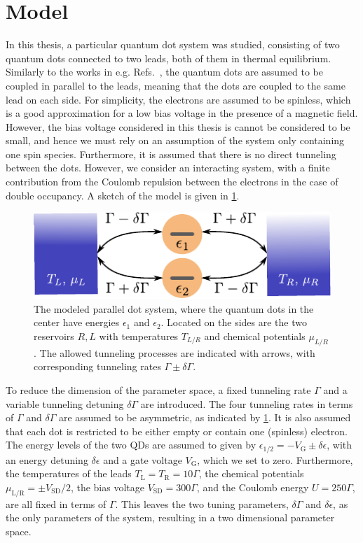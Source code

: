 \documentclass[../main.tex]{subfiles}
\begin{document}
\section{Model}
In this thesis, a particular quantum dot system was studied, consisting of two quantum dots connected to two leads, both of them in thermal equilibrium. Similarly to the works in e.g. Refs.~\cite{doubledot,doubledot2}, the quantum dots are assumed to be coupled in parallel to the leads, meaning that the dots are coupled to the same lead on each side. For simplicity, the electrons are assumed to be spinless, which is a good approximation for a low bias voltage in the presence of a magnetic field. However, the bias voltage considered in this thesis is cannot be considered to be small, and hence we must rely on an assumption of the system only containing one spin species. Furthermore, it is assumed that there is no direct tunneling between the dots. However, we consider an interacting system, with a finite contribution from the Coulomb repulsion between the electrons in the case of double occupancy. A sketch of the model is given in \cref{fig:model}.
\begin{figure}[H] \centering
    \includegraphics[width=0.8\linewidth]{figures/model.pdf}
    \caption{The modeled parallel dot system, where the quantum dots in the center have energies $\epsilon_1$ and $\epsilon_2$. Located on the sides are the two reservoirs $R,L$ with temperatures $T_{L/R}$ and chemical potentials $\mu_{L/R}$. The allowed tunneling processes are indicated with arrows, with corresponding tunneling rates $\Gamma \pm \delta\Gamma$.}
    \label{fig:model}
\end{figure}
To reduce the dimension of the parameter space, a fixed tunneling rate $\Gamma$ and a variable tunneling detuning $\delta\Gamma$ are introduced. The four tunneling rates in terms of $\Gamma$ and $\delta\Gamma$ are assumed to be asymmetric, as indicated by \cref{fig:model}. It is also assumed that each dot is restricted to be either empty or contain one (spinless) electron. The energy levels of the two QDs are assumed to given by $\epsilon_{1/2} = -V_\text{G} \pm \delta\epsilon$, with an energy detuning $\delta\epsilon$ and a gate voltage $V_\text{G}$, which we set to zero. Furthermore, the temperatures of the leads $T_\text{L}=T_\text{R}=10\Gamma$, the chemical potentials $\mu_\text{L/R} = \pm V_\text{SD}/2$, the bias voltage $V_\text{SD} = 300\Gamma$, and the Coulomb energy $U = 250\Gamma$, are all fixed in terms of $\Gamma$. This leaves the two tuning parameters, $\delta\Gamma$ and $\delta\epsilon$, as the only parameters of the system, resulting in a two dimensional parameter space. 
\end{document}
